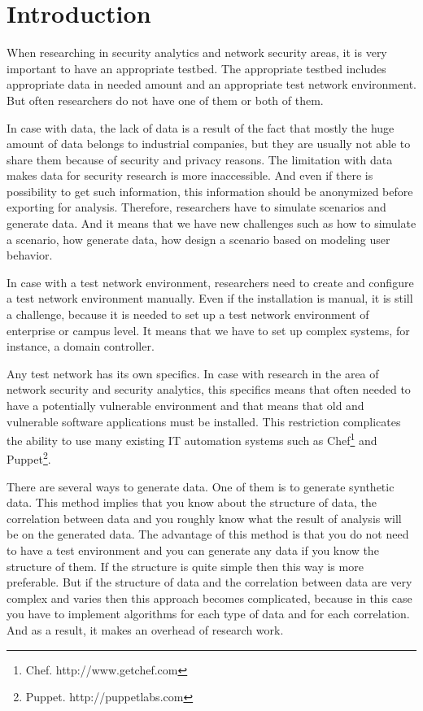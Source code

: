 \section{Introduction}


When researching in security analytics and network security areas, it is very important to have an appropriate testbed. The appropriate testbed includes appropriate data in needed amount and an appropriate test network environment. But often researchers do not have one of them or both of them.  

In case with data, the lack of data is a result of the fact that mostly the huge amount of data belongs to industrial companies, but they are usually not able to share them because of security and privacy reasons. The limitation with data makes data for security research is more inaccessible. And even if there is possibility to get such information, this information should be anonymized before exporting for analysis. Therefore, researchers have to simulate scenarios and generate data. And it means that we have new challenges such as how to simulate a scenario, how generate data, how design a scenario based on modeling user behavior. 

In case with a test network environment, researchers need to create and configure a test network environment manually. Even if the installation is manual, it is still a challenge, because it is needed to set up a test network environment of enterprise or campus level. It means that we have to set up complex systems, for instance, a domain controller. 

Any test network has its own specifics. In case with research in the area of network security and security analytics, this specifics means that often needed to have a potentially vulnerable environment and that means that old and vulnerable software applications must be installed. This restriction complicates the ability to use many existing IT automation systems such as Chef\footnote{Chef. http://www.getchef.com} and Puppet\footnote{Puppet. http://puppetlabs.com}. %

There are several ways to generate data. One of them is to generate synthetic data. This method implies that you know about the structure of data, the correlation between data and you roughly know what the result of analysis will be on the generated data. The advantage of this method is that you do not need to have a test environment and you can generate any data if you know the structure of them. If the structure is quite simple then this way is more preferable. But if the structure of data and the correlation between data are very complex and varies then this approach becomes complicated, because in this case you have to implement algorithms for each type of data and for each correlation. And as a result, it makes an overhead of research work.

